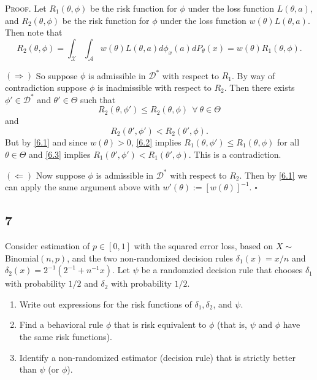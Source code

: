 \documentclass[12pt]{article}
\newcounter{ProofCounter}
\newenvironment{Proof}{\stepcounter{ProofCounter}\textsc{Proof.}}{\hfill$\square$}
\begin{document}
\begin{Proof}
  Let $R_1(\theta, \phi)$ be the risk function for $\phi$ under the loss function $L(\theta, a)$, and $R_2(\theta, \phi)$ be the risk function for
  $\phi$ under the loss function $w(\theta)L(\theta, a)$. Then note that 
  \begin{equation}
    R_2(\theta, \phi) = \int_{\mathcal{X}}\int_{\mathcal{A}}w(\theta)L(\theta, a)d\phi_x(a)dP_{\theta}(x) = w(\theta)R_1(\theta, \phi).
    \label{6.1}
  \end{equation}

  $(\Rightarrow)$ So suppose $\phi$ is admissible in $\mathcal{D}^{*}$ with respect to $R_1$. By way of contradiction suppose $\phi$ is inadmissible 
  with respect to $R_2$. Then there exists $\phi' \in \mathcal{D}^{*}$ and $\theta' \in \Theta$ such that 
  \begin{equation}
    R_2(\theta, \phi') \leq R_2(\theta, \phi) \ \ \forall \ \theta \in \Theta
    \label{6.2}
  \end{equation}
  and 
  \begin{equation}
    R_2(\theta', \phi') < R_2(\theta', \phi).
    \label{6.3}
  \end{equation}
  But by \eqref{6.1} and since $w(\theta) > 0$, \eqref{6.2} implies $R_1(\theta, \phi') \leq R_1(\theta, \phi)$ for all $\theta \in \Theta$ and \eqref{6.3} implies $R_1(\theta',
  \phi') < R_1(\theta', \phi)$. This is a contradiction.

  $(\Leftarrow)$ Now suppose $\phi$ is admissible in $\mathcal{D}^{*}$ with respect to $R_2$. Then by \eqref{6.1} we can apply the same argument above with 
  $w'(\theta) := [w(\theta)]^{-1}$.
\end{Proof}


\newpage
\subsection*{7}
\begin{tcolorbox}
  Consider estimation of $p \in [0,1]$ with the squared error loss, based on $X\sim$Binomial$(n,p)$, and the two non-randomized decision rules
  $\delta_1(x)= x/n$ and $\delta_2(x)= 2^{-1}(  2^{-1} + n^{-1}x)$. Let $\psi$ be a randomzied decision rule that chooses $\delta_1$ with probability $1/2$ and $\delta_2$ with probability $1/2$.

  \begin{enumerate}
    \item Write out expressions for the risk functions of $\delta_1,\delta_2$, and $\psi$.
    \item Find a behavioral rule $\phi$ that is risk equivalent to $\phi$ (that is, $\psi$ and $\phi$ have the same risk functions).
    \item Identify a non-randomized estimator (decision rule) that is strictly better than $\psi$ (or $\phi$).
  \end{enumerate}
\end{tcolorbox}
\end{document}
